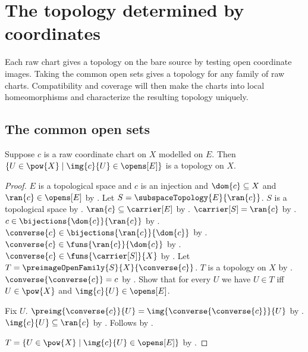 \section{The topology determined by coordinates}





Each raw chart gives a topology on the bare source by testing open coordinate
images. Taking the common open sets gives a topology for any family of raw
charts. Compatibility and coverage will then make the charts into local
homeomorphisms and characterize the resulting topology uniquely.

\subsection{The common open sets}

\begin{theorem}\label{raw_chart_induced_topology}
    Suppose $c$ is a raw coordinate chart on $X$ modelled on $E$.
    Then $\{U\in\pow{X}\mid\img{c}{U}\in\opens[E]\}$ is a topology on $X$.
\end{theorem}
\begin{proof}
    $E$ is a topological space and $c$ is an injection and
        $\dom{c}\subseteq X$ and $\ran{c}\in\opens[E]$ by
        .
    Let $S=\subspaceTopology{E}{\ran{c}}$.
    $S$ is a topological space by
        .
    $\ran{c}\subseteq\carrier[E]$ by .
    $\carrier[S]=\ran{c}$ by .
    $c\in\bijections{\dom{c}}{\ran{c}}$ by
        .
    $\converse{c}\in\bijections{\ran{c}}{\dom{c}}$ by
        .
    $\converse{c}\in\funs{\ran{c}}{\dom{c}}$ by .
    $\converse{c}\in\funs{\carrier[S]}{X}$ by .
    Let $T=\preimageOpenFamily{S}{X}{\converse{c}}$.
    $T$ is a topology on $X$ by .
    $\converse{\converse{c}}=c$ by .
    Show that for every $U$ we have $U\in T$ iff
        $U\in\pow{X}$ and $\img{c}{U}\in\opens[E]$.
    \begin{subproof}
        Fix $U$.
        $\preimg{\converse{c}}{U}=\img{\converse{\converse{c}}}{U}$ by
            .
        $\img{c}{U}\subseteq\ran{c}$ by .
        Follows by .
    \end{subproof}
    $T=\{U\in\pow{X}\mid\img{c}{U}\in\opens[E]\}$ by .
\end{proof}

